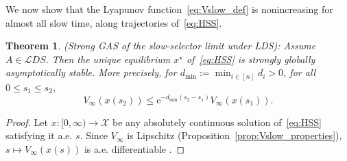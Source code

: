 \documentclass[letterpaper, conference]{ieeeconf}
\newcommand{\X}{\mathcal X}
\newtheorem{theorem}{Theorem}[section]
\newcommand{\longthmtitle}[1]{\mbox{}{\textit{(#1):}}}
\newcommand{\1}{\mathbf{1}}
\newcommand{\mc}{\mathcal}
\begin{document}
We now show that the Lyapunov function~\eqref{eq:Vslow_def} is nonincreasing for almost all slow time, along trajectories of~\eqref{eq:HSS}.
\begin{theorem}\longthmtitle{Strong GAS of the slow-selector limit under LDS}
\label{thm:slow_GAS}
Assume \(A\in\mc LDS\). Then the unique equilibrium \(x^\star\) of~\eqref{eq:HSS} is strongly globally asymptotically stable. More precisely, for \(d_{\min}:=\min_{i\in[n]} d_i>0\), for all \(0\le s_1\le s_2\),
\begin{equation}\label{eq:slowLyapunov-decay}
V_\infty(x(s_2))\le \mathrm{e}^{-d_{\min}(s_2-s_1)}V_\infty(x(s_1)).
\end{equation}
\end{theorem}
\vspace{11pt}
\begin{proof}
Let \(x:[0,\infty) \rightarrow \X\) be any absolutely continuous solution of~\eqref{eq:HSS} satisfying it a.e. \(s\). 
Since \(V_\infty\) is Lipschitz (Proposition~\ref{prop:Vslow_properties}), \(s\mapsto V_\infty(x(s))\) is a.e. differentiable \cite[Proposition 10]{JC:08}.


\end{proof}
\end{document}

